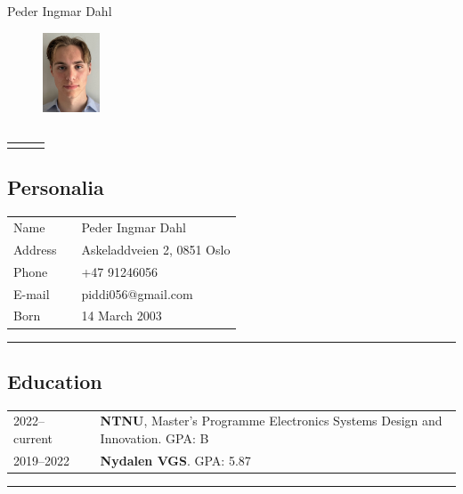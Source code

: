 \documentclass[10pt]{article}
\newlength{\cw}
\newlength{\cwl}
\begin{document}
\begin{center}
\Large{Peder Ingmar Dahl}
\end{center}


\begin{figure}
  \begin{center}
    \includegraphics[width=0.15\textwidth]{Vedlegg/cv_pp.png}
  \end{center}
\end{figure}

\subsection*{}
\begin{tabular}{p{\cw} @{ }l p{\cwl}}
 & & \\ 
\end{tabular}
\vspace{0.2cm}

\subsection*{Personalia}
\begin{tabular}{p{\cw} @{:}l p{\cwl}}
Name & & Peder Ingmar Dahl \\
Address & & Askeladdveien 2, 0851 Oslo\\
Phone & & +47 91246056\\ 
E-mail & & piddi056@gmail.com \\
Born & & 14 March 2003 
\end{tabular}
\vspace{0.1cm}
\hrule
\vspace{0.1cm}

\subsection*{Education}
\begin{tabular}{p{\cw} @{:}l p{\cwl}}
  2022--current & & \textbf{NTNU}, Master's Programme Electronics Systems Design and Innovation. GPA: B \\
  2019--2022 & & \textbf{Nydalen VGS}. GPA: 5.87 \\ 
\end{tabular}
\vspace{0.1cm}
\hrule
\vspace{0.1cm}
\end{document}

